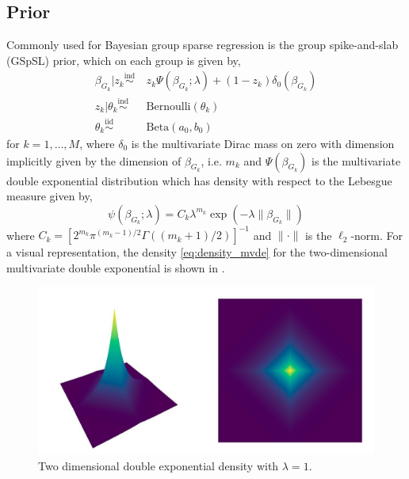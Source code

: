 \documentclass[12pt]{article}
\begin{document}
\subsection{Prior}

Commonly used for Bayesian group sparse regression is the group spike-and-slab (GSpSL) prior, which on each group is given by,
\begin{equation}
\begin{aligned}
\beta_{G_k} | z_k \overset{\text{ind}}{\sim} &\ z_k \Psi(\beta_{G_k}; \lambda) + (1-z_k) \delta_0(\beta_{G_k}) \\
z_k | \theta_k \overset{\text{ind}}{\sim} &\ \text{Bernoulli}(\theta_k) \\
\theta_k \overset{\text{iid}}{\sim} &\ \text{Beta}(a_0, b_0)
\end{aligned}
\end{equation}
for $k=1,\dots,M$, where $\delta_0$ is the multivariate Dirac mass on zero with dimension implicitly given by the dimension of $\beta_{G_k}$, i.e. $m_k$ and
$\Psi(\beta_{G_k})$ is the multivariate double exponential distribution which has density with respect to the Lebesgue measure given by,
\begin{equation} \label{eq:density_mvde}
    \psi(\beta_{G_k}; \lambda) = C_k \lambda^{m_k} \exp \left( - \lambda \| \beta_{G_k} \| \right)
\end{equation}
where $ C_k = \left[ 2^{m_k} \pi^{(m_k -1)/2} \Gamma \left( (m_k + 1) /2 \right) \right]^{-1} $ and $ \| \cdot \| $ is the $\ell_2$-norm. For a visual representation, the density \eqref{eq:density_mvde} for the two-dimensional multivariate double exponential is shown in .
\begin{figure}[htp]
    \centering
    \includegraphics[width=.9\textwidth]{./figures/de.jpg}
    \caption{Two dimensional double exponential density with $\lambda=1$.}
    \label{fig:double_exp}
\end{figure}
\end{document}
